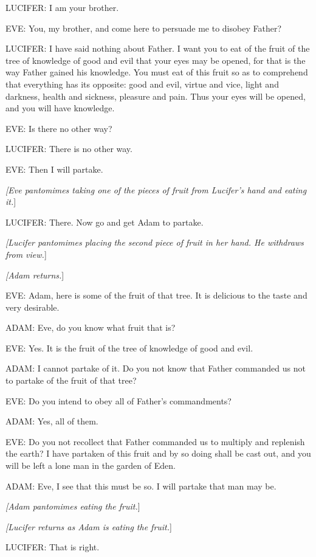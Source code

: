 			LUCIFER: I am your brother.

			EVE: You, my brother, and come here to persuade me to disobey Father?

			LUCIFER: I have said nothing about Father. I want you to eat of the fruit of the tree of knowledge of good and evil that your eyes may be opened, for that is the way Father gained his knowledge. You must eat of this fruit so as to comprehend that everything has its opposite: good and evil, virtue and vice, light and darkness, health and sickness, pleasure and pain. Thus your eyes will be opened, and you will have knowledge.

			EVE: Is there no other way?

			LUCIFER: There is no other way.

			EVE: Then I will partake.

			\textit{[Eve pantomimes taking one of the pieces of fruit from Lucifer's hand and eating it.}]

			LUCIFER: There. Now go and get Adam to partake.

			\textit{[Lucifer pantomimes placing the second piece of fruit in her hand. He withdraws from view.}]

			\textit{[Adam returns.}]

			EVE: Adam, here is some of the fruit of that tree. It is delicious to the taste and very desirable.

			ADAM: Eve, do you know what fruit that is?

			EVE: Yes. It is the fruit of the tree of knowledge of good and evil.

			ADAM: I cannot partake of it. Do you not know that Father commanded us not to partake of the fruit of that tree?

			EVE: Do you intend to obey all of Father's commandments?

			ADAM: Yes, all of them.

			EVE: Do you not recollect that Father commanded us to multiply and replenish the earth? I have partaken of this fruit and by so doing shall be cast out, and you will be left a lone man in the garden of Eden.

			ADAM: Eve, I see that this must be so. I will partake that man may be.

			\textit{[Adam pantomimes eating the fruit.}]
			
			\textit{[Lucifer returns as Adam is eating the fruit.}]

			LUCIFER: That is right.


